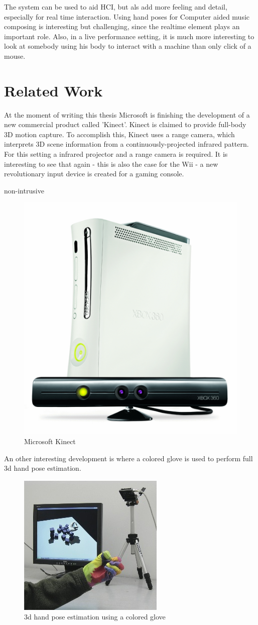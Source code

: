 The system can be used to aid HCI, but als add more feeling and detail, especially for real time interaction. Using hand poses for Computer aided music composing is interesting but challenging, since the realtime element plays an important role. Also, in a live performance setting, it is much more interesting to look at somebody using his body to interact with a machine than only click of a mouse.



\section{Related Work}
At the moment of writing this thesis Microsoft is finishing the development of a new commercial product called 'Kinect'. Kinect is claimed to provide full-body 3D motion capture. To accomplish this, Kinect uses a range camera, which interprets 3D scene information from a continuously-projected infrared pattern. For this setting a infrared projector and a range camera is required. It is interesting to see that again - this is also the case for the Wii - a new revolutionary input device is created for a gaming console. 

non-intrusive

\begin{figure}[htbp]
	\center{}
	\label{fig:kinect}
	\includegraphics[width=0.3\linewidth]{figures/wave.jpg}
	\caption{Microsoft Kinect}
\end{figure}


An other interesting development is \cite{Wang2009} where a colored glove is used to perform full 3d hand pose estimation.

\begin{figure}[htbp]
	\center{}
	\label{fig:wang2009}
	\includegraphics[width=0.3\linewidth]{figures/wang2009.jpg}
	\caption{3d hand pose estimation using a colored glove}
\end{figure}

